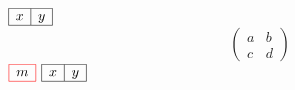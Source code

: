 \documentclass{article}
\begin{document}
$\begin{array}{|c|c|}\hline x & y\\\hline\end{array}$
\[\left(\begin{array}{c|c} a & b\\ c & d\end{array}\right)\]
$\begin{array}{|c|}\arrayrulecolor{red}\hline m\\\hline\end{array}$
$\begin{array}{|c|c|}\hline x & y\\\hline\end{array}$
\end{document}
